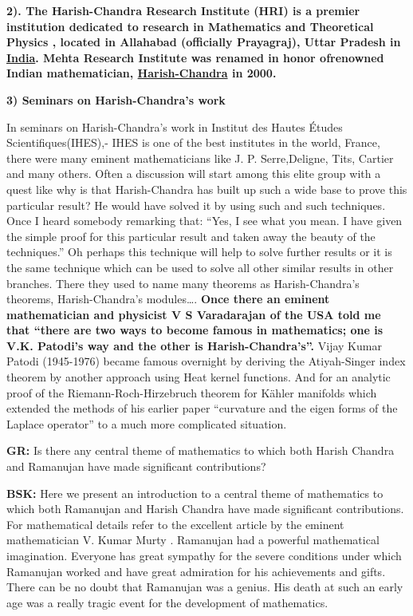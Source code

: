 \textbf{2). The Harish-Chandra Research Institute (HRI) is a premier institution dedicated to research in Mathematics and Theoretical Physics , located in Allahabad (officially Prayagraj), Uttar Pradesh in \underline{India}. Mehta  Research Institute was renamed in honor of\break renowned Indian mathematician, \underline{Harish-Chandra} in 2000.}

\textbf{3) Seminars on Harish-Chandra’s work}

In seminars on Harish-Chandra’s work in  Institut des Hautes Études Scientifiques(IHES),-  IHES is one of the best institutes in the world, France, there were many eminent mathematicians like J. P. Serre,\break Deligne, Tits, Cartier and many others.  Often a discussion will start among this elite group with a quest like why is that Harish-Chandra has built up such a wide base to prove this particular result?  He would have solved it by using such and such techniques. Once I heard somebody remarking that: “Yes, I see what you mean. I have given the simple proof for this particular result and taken away the beauty of the techniques.” Oh perhaps this technique will help to solve further results or it is the same technique which can be used to solve all other similar results in other branches.  There they used to name many theorems as Harish-Chandra’s theorems, Harish-Chandra’s modules….  \textbf{Once there an eminent mathematician and physicist V S Varadarajan of the USA told me that “there are two ways to become famous in mathematics; one is V.K. Patodi’s way and the other is Harish-Chandra’s”.} Vijay Kumar Patodi (1945-1976) became famous overnight by deriving the Atiyah-Singer index theorem by another approach using Heat kernel functions. And for an analytic proof of the Riemann-Roch-Hirzebruch theorem for Kähler manifolds which extended the methods of his earlier paper “curvature and the eigen forms of the Laplace operator” to a much more complicated situation.

\textbf{GR:} Is there any central theme of mathematics to which both Harish Chandra and Ramanujan have made significant contributions?

\textbf{BSK:} Here we present an introduction to a central theme of mathematics to which both Ramanujan and Harish Chandra have made significant contributions. For mathematical details refer to the excellent article by the eminent mathematician V. Kumar Murty \cite{chap17-key10VKM}. Ramanujan had a powerful mathematical imagination.  Everyone has great sympathy for the severe conditions under which Ramanujan worked and have great admiration for his achievements and gifts. There can be no doubt that Ramanujan was a genius. His death at such an early age was a really tragic event for the development of mathematics.
 
